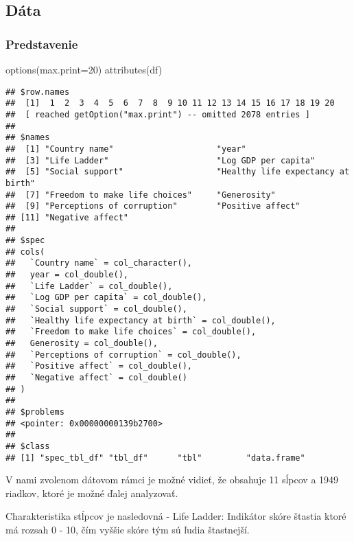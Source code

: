 \documentclass[
]{article}
\newenvironment{Shaded}{\begin{snugshade}}{\end{snugshade}}
\newcommand{\AttributeTok}[1]{\textcolor[rgb]{0.77,0.63,0.00}{#1}}
\newcommand{\DecValTok}[1]{\textcolor[rgb]{0.00,0.00,0.81}{#1}}
\newcommand{\FunctionTok}[1]{\textcolor[rgb]{0.00,0.00,0.00}{#1}}
\newcommand{\NormalTok}[1]{#1}
\begin{document}
\hypertarget{duxe1ta}{%
\subsection{Dáta}\label{duxe1ta}}

\hypertarget{predstavenie}{%
\subsubsection{Predstavenie}\label{predstavenie}}

\begin{Shaded}
\begin{Highlighting}[]
\FunctionTok{options}\NormalTok{(}\AttributeTok{max.print=}\DecValTok{20}\NormalTok{)}
\FunctionTok{attributes}\NormalTok{(df)}
\end{Highlighting}
\end{Shaded}

\begin{verbatim}
## $row.names
##  [1]  1  2  3  4  5  6  7  8  9 10 11 12 13 14 15 16 17 18 19 20
##  [ reached getOption("max.print") -- omitted 2078 entries ]
## 
## $names
##  [1] "Country name"                     "year"                            
##  [3] "Life Ladder"                      "Log GDP per capita"              
##  [5] "Social support"                   "Healthy life expectancy at birth"
##  [7] "Freedom to make life choices"     "Generosity"                      
##  [9] "Perceptions of corruption"        "Positive affect"                 
## [11] "Negative affect"                 
## 
## $spec
## cols(
##   `Country name` = col_character(),
##   year = col_double(),
##   `Life Ladder` = col_double(),
##   `Log GDP per capita` = col_double(),
##   `Social support` = col_double(),
##   `Healthy life expectancy at birth` = col_double(),
##   `Freedom to make life choices` = col_double(),
##   Generosity = col_double(),
##   `Perceptions of corruption` = col_double(),
##   `Positive affect` = col_double(),
##   `Negative affect` = col_double()
## )
## 
## $problems
## <pointer: 0x00000000139b2700>
## 
## $class
## [1] "spec_tbl_df" "tbl_df"      "tbl"         "data.frame"
\end{verbatim}

V nami zvolenom dátovom rámci je možné vidieť, že obsahuje 11 sĺpcov a
1949 riadkov, ktoré je možné ďalej analyzovať.

Charakteristika stĺpcov je nasledovná - Life Ladder: Indikátor skóre
štastia ktoré má rozsah 0 - 10, čím vyššie skóre tým sú ľudia
štastnejší.
\end{document}
